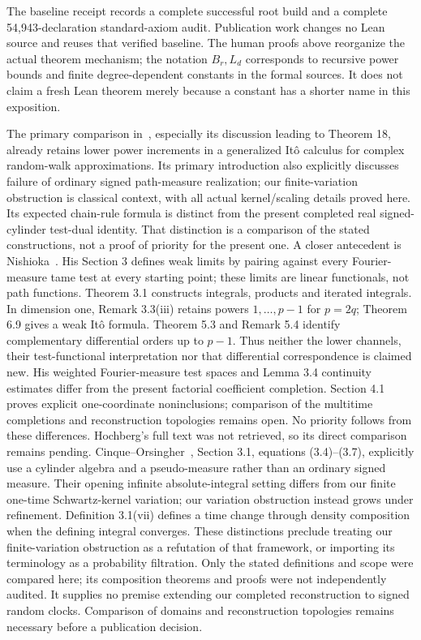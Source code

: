 \documentclass[11pt]{article}
\theoremstyle{remark}\newtheorem{remark}[theorem]{Remark}
\begin{document}
The baseline receipt records a complete successful root build and
a complete 54,943-declaration standard-axiom audit. Publication work
changes no Lean source and reuses that verified baseline. The
human proofs above reorganize the actual theorem mechanism; the
notation $B_r,L_d$ corresponds to recursive power bounds and finite
degree-dependent constants in the formal sources. It does not
claim a fresh Lean theorem merely because a constant has a shorter
name in this exposition.

The primary comparison in~\cite{bcm}, especially its discussion
leading to Theorem 18, already retains lower power increments
in a generalized It\^o calculus for complex random-walk
approximations. Its primary introduction also explicitly discusses failure of ordinary signed path-measure realization; our finite-variation obstruction is classical context, with all actual kernel/scaling details proved here. Its expected chain-rule formula is distinct from
the present completed real signed-cylinder test-dual identity.
That distinction is a comparison of the stated constructions,
not a proof of priority for the present one.
A closer antecedent is Nishioka~\cite{nishioka}.
His Section 3 defines weak limits by pairing against every
Fourier-measure tame test at every starting point; these limits
are linear functionals, not path functions. Theorem 3.1 constructs
integrals, products and iterated integrals. In dimension one,
Remark 3.3(iii) retains powers $1,\ldots,p-1$ for $p=2q$;
Theorem 6.9 gives a weak It\^o formula. Theorem 5.3 and
Remark 5.4 identify complementary differential orders up to $p-1$.
Thus neither the lower channels, their test-functional
interpretation nor that differential correspondence is claimed new.
His weighted Fourier-measure test spaces and Lemma 3.4 continuity
estimates differ from the present factorial coefficient completion.
Section 4.1 proves explicit one-coordinate noninclusions;
comparison of the multitime completions and reconstruction
topologies remains open. No priority follows from these differences.
Hochberg's full text was not retrieved, so its direct comparison
remains pending.
Cinque--Orsingher~\cite{co}, Section 3.1, equations (3.4)--(3.7),
explicitly use a cylinder algebra and a pseudo-measure rather than
an ordinary signed measure. Their opening infinite absolute-integral
setting differs from our finite one-time Schwartz-kernel variation;
our variation obstruction instead grows under refinement.
Definition 3.1(vii) defines a time change through density composition
when the defining integral converges. These distinctions preclude
treating our finite-variation obstruction as a refutation of that
framework, or importing its terminology as a probability filtration.
Only the stated definitions and scope were compared here; its
composition theorems and proofs were not independently audited.
It supplies no premise extending our completed reconstruction to
signed random clocks. Comparison of domains and reconstruction
topologies remains necessary before a publication decision.
\end{document}
